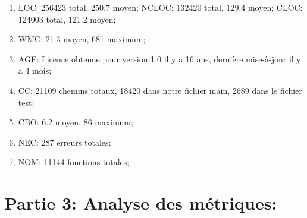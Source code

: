 \documentclass{article}
\begin{document}
\begin{enumerate}[leftmargin=*]
\item
LOC: 256423 total, 250.7 moyen; NCLOC: 132420 total, 129.4 moyen; CLOC: 124003 total, 121.2 moyen;
\item
WMC: 21.3 moyen, 681 maximum;
\item
AGE: Licence obtenue pour version 1.0 il y a 16 ans, dernière mise-à-jour il y a 4 mois;
\item
CC: 21109 chemins totaux, 18420 dans notre fichier main, 2689 dans le fichier test;
\item
CBO: 6.2 moyen, 86 maximum;
\item
NEC: 287 erreurs totales;
\item
NOM: 11144 fonctions totales;
\end{enumerate}

\section{Partie 3: Analyse des métriques:}
\end{document}
